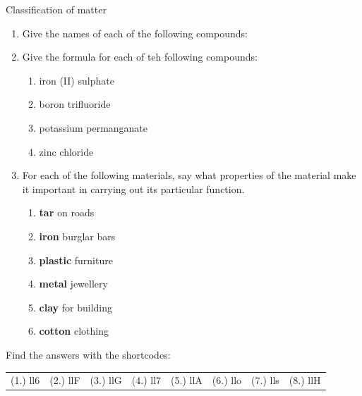 \begin{eocexercises}{Classification of matter }
{\begin{enumerate}[noitemsep, label=\textbf{\arabic*}. ]
\begin{enumerate}[noitemsep, label=\textbf{\alph*}. ]
\end{enumerate}
\label{m38706*uid153}\item Give the names of each of the following compounds:
\label{m38706*id68358}\begin{enumerate}[noitemsep, label=\textbf{\alph*}. ] 
            \label{m38706*uid154}\item $\mathrm{NaBr}$
\label{m38706*uid155}\item ${\mathrm{Ba}(\mathrm{NO}}}_{2})_2$
\label{m38706*uid156}\item ${\mathrm{SO}}_{2}$ 
\item $\mathrm{H}_{2}\mathrm{SO}_{4}$
\end{enumerate}
\item Give the formula for each of teh following compounds:
\begin{enumerate}[noitemsep, label=\textbf{\alph*}.]
 \item iron (II) sulphate
\item boron trifluoride
\item potassium permanganate
\item zinc chloride
\end{enumerate}

\label{m38706*uid157}\item For each of the following materials, say what properties of the material make it important in carrying out its particular function.
\label{m38706*id68436}\begin{enumerate}[noitemsep, label=\textbf{\alph*}. ] 
            \label{m38706*uid158}\item \textbf{tar} on roads
\label{m38706*uid159}\item \textbf{iron} burglar bars
\label{m38706*uid160}\item \textbf{plastic} furniture
\label{m38706*uid161}\item \textbf{metal} jewellery
\label{m38706*uid162}\item \textbf{clay} for building
\label{m38706*uid163}\item \textbf{cotton} clothing
\end{enumerate}
\end{enumerate}
  \label{m38706**end}
  \label{09a7a4809656be0b739ee130746cd803**end}
\par {} Find the answers with the shortcodes:
 \par \begin{tabular}[h]{cccccc}
 (1.) ll6  &  (2.) llF  &  (3.) llG  &  (4.) ll7  &  (5.) llA  &  (6.) llo  &  (7.) lls  &  (8.) llH  & \end{tabular}}
\end{eocexercises}
